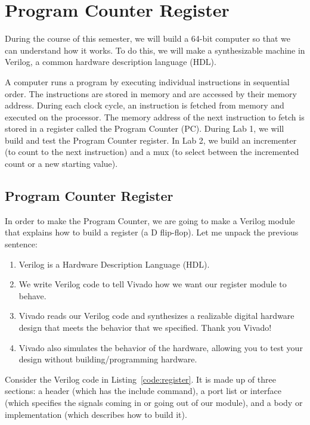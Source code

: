 \chapter{Program Counter Register}

During the course of this semester, we will build a 64-bit computer so that we can understand how it works.  To do this, we will make a synthesizable machine in Verilog, a common hardware description language (HDL).  

A computer runs a program by executing individual instructions in sequential order.  The instructions are stored in memory and are accessed by their memory address.  During each clock cycle, an instruction is fetched from memory and executed on the processor.  The memory address of the next instruction to fetch is stored in a register called the Program Counter (PC).  During Lab 1, we will build and test the Program Counter register.  In Lab 2, we build an incrementer (to count to the next instruction) and a mux (to select between the incremented count or a new starting value).   

\section{Program Counter Register}

In order to make the Program Counter, we are going to make a Verilog module that explains how to build a register (a D flip-flop).  Let me unpack the previous sentence:
\begin{enumerate}
	\item Verilog is a Hardware Description Language (HDL).
	\item We write Verilog code to tell Vivado how we want our register module to behave.
	\item Vivado reads our Verilog code and synthesizes a realizable digital hardware design that meets the behavior that we specified.  Thank you Vivado!
	\item Vivado also simulates the behavior of the hardware, allowing you to test your design without building/programming hardware.
\end{enumerate}   
Consider the Verilog code in Listing~\ref{code:register}.  It is made up of three sections: a header (which has the include command), a port list or interface (which specifies the signals coming in or going out of our module), and a body or implementation (which describes how to build it).


